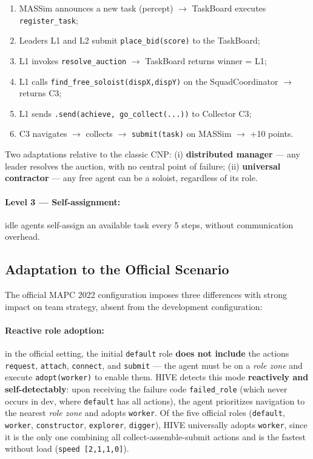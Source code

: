 \documentclass[11pt,a4paper]{article}
\newcommand{\code}[1]{\texttt{#1}}
\begin{document}
\begin{enumerate}
  \item MASSim announces a new task (percept) $\rightarrow$ TaskBoard executes \code{register\_task};
  \item Leaders L1 and L2 submit \code{place\_bid(score)} to the TaskBoard;
  \item L1 invokes \code{resolve\_auction} $\rightarrow$ TaskBoard returns winner = L1;
  \item L1 calls \code{find\_free\_soloist(dispX,dispY)} on the SquadCoordinator $\rightarrow$ returns C3;
  \item L1 sends \code{.send(achieve, go\_collect(...))} to Collector C3;
  \item C3 navigates $\rightarrow$ collects $\rightarrow$ \code{submit(task)} on MASSim $\rightarrow$ +10 points.
\end{enumerate}

Two adaptations relative to the classic CNP: (i) \textbf{distributed manager} --- any leader resolves the auction, with no central point of failure; (ii) \textbf{universal contractor} --- any free agent can be a soloist, regardless of its role.

\paragraph{Level 3 --- Self-assignment:} idle agents self-assign an available task every 5 steps, without communication overhead.

\subsection{Adaptation to the Official Scenario}
The official MAPC 2022 configuration imposes three differences with strong impact on team strategy, absent from the development configuration:

\paragraph{Reactive role adoption:} in the official setting, the initial \code{default} role \textbf{does not include} the actions \code{request}, \code{attach}, \code{connect}, and \code{submit} --- the agent must be on a \emph{role zone} and execute \code{adopt(worker)} to enable them. HIVE detects this mode \textbf{reactively and self-detectably}: upon receiving the failure code \code{failed\_role} (which never occurs in dev, where \code{default} has all actions), the agent prioritizes navigation to the nearest \emph{role zone} and adopts \code{worker}. Of the five official roles (\code{default}, \code{worker}, \code{constructor}, \code{explorer}, \code{digger}), HIVE universally adopts \code{worker}, since it is the only one combining all collect-assemble-submit actions and is the fastest without load (\code{speed [2,1,1,0]}).
\end{document}
